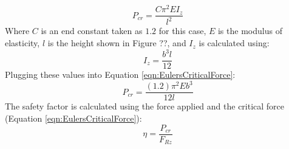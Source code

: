 \documentclass[../main.tex]{subfiles}
\begin{document}
\begin{equation} \label{eqn:EulersCriticalForce}
P_{cr} = \frac{C\pi^2EI_z}{l^2}
\end{equation}
Where $C$ is an end constant taken as $1.2$ for this case, $E$ is the modulus of elasticity, $l$ is the height shown in Figure ??, and $I_z$ is calculated using:
\begin{equation}
I_z = \frac{b^3l}{12}
\end{equation}
Plugging these values into Equation \ref{eqn:EulersCriticalForce}:
\begin{equation}
P_{cr} = \frac{(1.2)\pi^2Eb^3}{12l}
\end{equation}
The safety factor is calculated using the force applied and the critical force (Equation \ref{eqn:EulersCriticalForce}):
\begin{equation}
\eta = \frac{P_{cr}}{F_{Rz}}
\end{equation}
\end{document}
